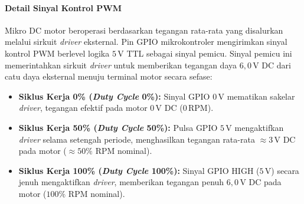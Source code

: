 \paragraph{Detail Sinyal Kontrol PWM}
Mikro DC motor beroperasi berdasarkan tegangan rata-rata yang disalurkan melalui sirkuit \textit{driver} eksternal. Pin GPIO mikrokontroler mengirimkan sinyal kontrol PWM berlevel logika $5\,\text{V}$ TTL sebagai sinyal pemicu. Sinyal pemicu ini memerintahkan sirkuit \textit{driver} untuk memberikan tegangan daya $6{,}0\,\text{V DC}$ dari catu daya eksternal menuju terminal motor secara sefase:

\begin{itemize}
	\item \textbf{Siklus Kerja 0\% (\textit{Duty Cycle} 0\%):} Sinyal GPIO $0\,\text{V}$ mematikan sakelar \textit{driver}, tegangan efektif pada motor $0\,\text{V DC}$ ($0\,\text{RPM}$).
	\item \textbf{Siklus Kerja 50\% (\textit{Duty Cycle} 50\%):} Pulsa GPIO $5\,\text{V}$ mengaktifkan \textit{driver} selama setengah periode, menghasilkan tegangan rata-rata $\approx 3\,\text{V DC}$ pada motor ($\approx 50\%$ RPM nominal).
	\item \textbf{Siklus Kerja 100\% (\textit{Duty Cycle} 100\%):} Sinyal GPIO HIGH ($5\,\text{V}$) secara jenuh mengaktifkan \textit{driver}, memberikan tegangan penuh $6{,}0\,\text{V DC}$ pada motor ($100\%$ RPM nominal).
\end{itemize}

